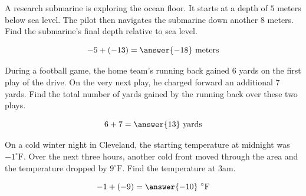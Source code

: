 \documentclass{ximera}[font=12pt]
\begin{document}
\begin{problem}
A research submarine is exploring the ocean floor.  It starts at a depth of $5$ meters below sea level.  The pilot then 
navigates the submarine down another $8$ meters.  Find the submarine's final depth relative to sea level.

\[ -5 + (-13) = \answer{-18} \ \textrm{meters} \]

\end{problem}


\begin{problem}
During a football game, the home team's running back gained $6$ yards on the first play of the drive. 
On the very next play, he charged forward an additional $7$ yards.  Find the total number of yards 
gained by the running back over these two plays.

\[ 6 + 7 = \answer{13} \ \textrm{yards} \]

\end{problem}


\begin{problem}
On a cold winter night in Cleveland, the starting temperature at midnight was $-1^\circ\text{F}$.  Over the next three 
hours, another cold front moved through the area and the temperature dropped by $9^\circ\text{F}.$  Find the 
temperature at 3am.

\[ -1 + (-9) = \answer{-10} \ ^\circ\text{F} \]
\end{problem}
\end{document}

